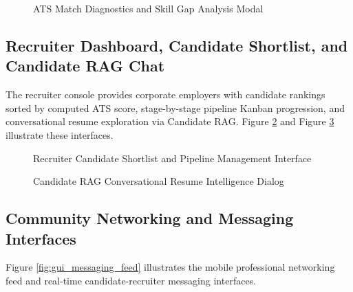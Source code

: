 \begin{figure}[h!]
\centering
{}
\caption{ATS Match Diagnostics and Skill Gap Analysis Modal}
\label{fig:gui_ats_modal}
\end{figure}

\subsection{Recruiter Dashboard, Candidate Shortlist, and Candidate RAG Chat}
The recruiter console provides corporate employers with candidate rankings sorted by computed ATS score, stage-by-stage pipeline Kanban progression, and conversational resume exploration via Candidate RAG. Figure \ref{fig:gui_recruiter_console} and Figure \ref{fig:gui_rag_chat} illustrate these interfaces.

\begin{figure}[h!]
\centering
{}
\caption{Recruiter Candidate Shortlist and Pipeline Management Interface}
\label{fig:gui_recruiter_console}
\end{figure}

\begin{figure}[h!]
\centering
{}
\caption{Candidate RAG Conversational Resume Intelligence Dialog}
\label{fig:gui_rag_chat}
\end{figure}

\subsection{Community Networking and Messaging Interfaces}
Figure \ref{fig:gui_messaging_feed} illustrates the mobile professional networking feed and real-time candidate-recruiter messaging interfaces.

